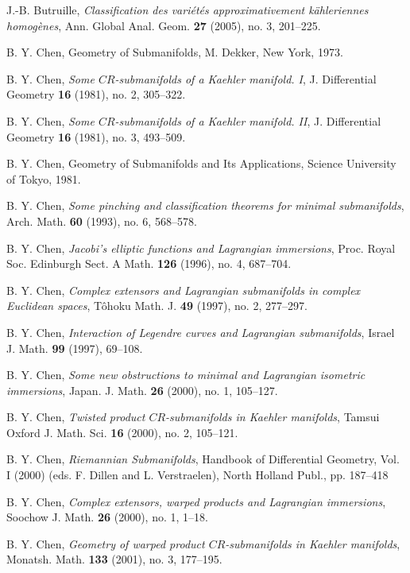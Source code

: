 \documentclass{amsart}
\theoremstyle{plain}
\numberwithin{equation}{section}
\theoremstyle{remark}
\numberwithin{equation}{section}
\begin{document}
\begin{thebibliography}{120}
 J.-B. Butruille,  {\it Classification des vari\'et\'es approximativement k\"ahleriennes homog\`enes}, 
Ann. Global Anal. Geom. {\bf 27} (2005), no. 3, 201--225.

 B. Y. Chen,  Geometry of Submanifolds, M. Dekker, New York, 1973.

 B. Y. Chen, {\em Some $CR$-submanifolds of a Kaehler manifold. I}, J. Differential Geometry {\bf 16} (1981), no. 2, 305--322.

 B. Y. Chen, {\em Some $CR$-submanifolds of a Kaehler manifold. II}, J. Differential Geometry {\bf 16} (1981), no. 3, 493--509.

 B. Y. Chen,  Geometry of Submanifolds and Its Applications, Science University of Tokyo,  1981.

 B. Y. Chen, {\em Some pinching and classification theorems for minimal submanifolds}, Arch. Math. {\bf 60} (1993), no. 6, 568--578.

 B. Y. Chen,  {\em  Jacobi's elliptic functions and Lagrangian immersions}, { Proc.  Royal Soc. Edinburgh Sect. A Math.} {\bf 126} (1996), no. 4, 687--704.

 B. Y. Chen,  {\em  Complex extensors and Lagrangian submanifolds in complex Euclidean spaces}, { T\^ohoku Math. J.} {\bf 49} (1997), no. 2,  277--297.

 B. Y. Chen, {\em  Interaction of Legendre curves and Lagrangian submanifolds}, Israel J. Math. {\bf 99} (1997), 69--108. 

 B. Y. Chen,  {\em Some new obstructions to minimal and Lagrangian isometric immersions}, Japan. J. Math. {\bf 26} (2000), no. 1, 105--127.

 B. Y. Chen,  {\em Twisted product $CR$-submanifolds in Kaehler manifolds}, Tamsui Oxford J. Math. Sci. {\bf 16} (2000), no. 2, 105--121.

 B. Y. Chen,  {\em Riemannian Submanifolds}, Handbook of Differential Geometry, Vol. I (2000) (eds. F. Dillen and L. Verstraelen), North Holland Publ.,  pp. 187--418

 B. Y. Chen,  {\em  Complex extensors, warped products and Lagrangian immersions},  Soochow J. Math. {\bf 26} (2000), no. 1, 1--18.

 B. Y. Chen,  {\em  Geometry of warped product $CR$-submanifolds in Kaehler manifolds}, Monatsh. Math. {\bf 133} (2001), no. 3, 177--195.


\end{thebibliography}
\end{document}

